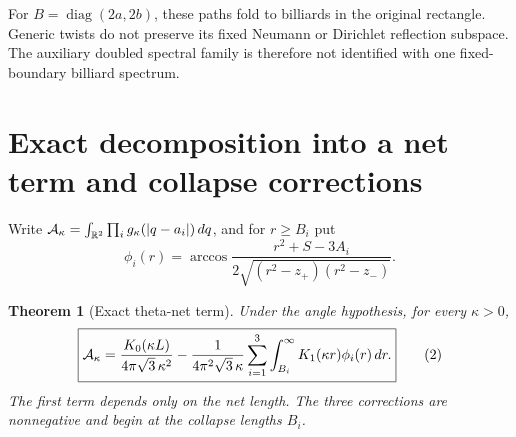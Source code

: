 \documentclass[11pt]{article}
\newtheorem{theorem}{Theorem}
\begin{document}
For \(B=\operatorname{diag}(2a,2b)\), these paths fold to billiards in
the original rectangle. Generic twists do not preserve its fixed
Neumann or Dirichlet reflection subspace. The auxiliary doubled
spectral family is therefore not identified with one fixed-boundary
billiard spectrum.

\section{Exact decomposition into a net term and collapse corrections}
Write \({\cal A}_\kappa=\int_{\mathbb R^2}\prod_i
g_\kappa(|q-a_i|)\,dq\), and for \(r\geq B_i\) put
\[
 \phi_i(r)=\arccos
 \frac{r^2+S-3A_i}{2\sqrt{(r^2-z_+)(r^2-z_-)}}.
\]
\begin{theorem}[Exact theta-net term]
Under the angle hypothesis, for every \(\kappa>0\),
\[
 \boxed{\displaystyle
 {\cal A}_\kappa=
 \frac{K_0(\kappa L)}{4\pi\sqrt3\,\kappa^2}
 -\frac1{4\pi^2\sqrt3\,\kappa}
 \sum_{i=1}^3\int_{B_i}^\infty K_1(\kappa r)\phi_i(r)\,dr.}
 \tag{2}
\]
The first term depends only on the net length. The three corrections
are nonnegative and begin at the collapse lengths \(B_i\).
\end{theorem}
\end{document}
